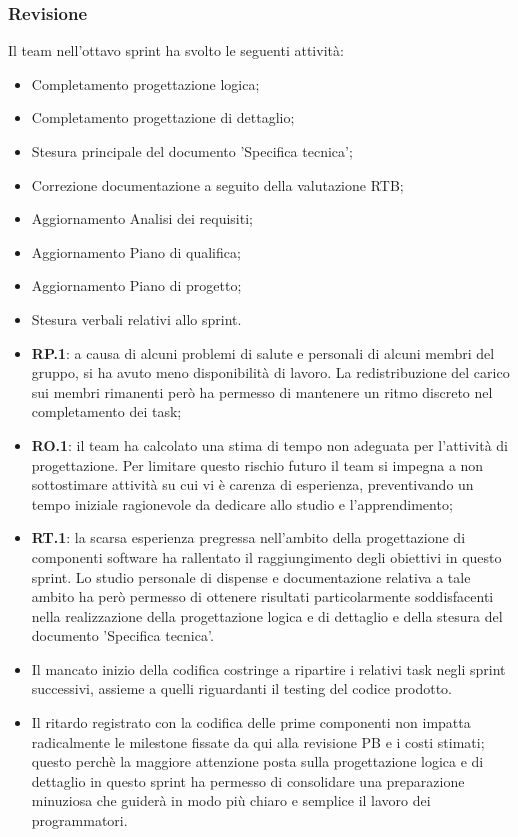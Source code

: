 \documentclass[10pt, a4paper]{article}
\begin{document}
\subsubsection{Revisione}
Il team nell'ottavo sprint ha svolto le seguenti attività:
\begin{itemize}
    \item Completamento progettazione logica;
    \item Completamento progettazione di dettaglio;
    \item Stesura principale del documento 'Specifica tecnica';
    \item Correzione documentazione a seguito della valutazione RTB;
    \item Aggiornamento Analisi dei requisiti;
    \item Aggiornamento Piano di qualifica;
    \item Aggiornamento Piano di progetto;
    \item Stesura verbali relativi allo sprint.
\end{itemize}
\begin{itemize}
    \item \textbf{RP.1}: a causa di alcuni problemi di salute e personali di alcuni membri del gruppo, si ha avuto meno disponibilità di lavoro. La redistribuzione del carico sui membri rimanenti però ha permesso di mantenere un ritmo discreto nel completamento dei task;
    \item \textbf{RO.1}: il team ha calcolato una stima di tempo non adeguata per l'attività di progettazione. Per limitare questo rischio futuro il team si impegna a non sottostimare attività su cui vi è carenza di esperienza, preventivando un tempo iniziale ragionevole da dedicare allo studio e l'apprendimento;
    \item \textbf{RT.1}: la scarsa esperienza pregressa nell'ambito della progettazione di componenti software ha rallentato il raggiungimento degli obiettivi in questo sprint. Lo studio personale di dispense e documentazione relativa a tale ambito ha però permesso di ottenere risultati particolarmente soddisfacenti nella realizzazione della progettazione logica e di dettaglio e della stesura del documento 'Specifica tecnica'.
\end{itemize}
\begin{itemize}
    \item Il mancato inizio della codifica costringe a ripartire i relativi task negli sprint successivi, assieme a quelli riguardanti il testing del codice prodotto.
\end{itemize}
\begin{itemize}
    \item Il ritardo registrato con la codifica delle prime componenti non impatta radicalmente le milestone fissate da qui alla revisione PB e i costi stimati; questo perchè la maggiore attenzione posta sulla progettazione logica e di dettaglio in questo sprint ha permesso di consolidare una preparazione minuziosa che guiderà in modo più chiaro e semplice il lavoro dei programmatori.
\end{itemize}
\end{document}
